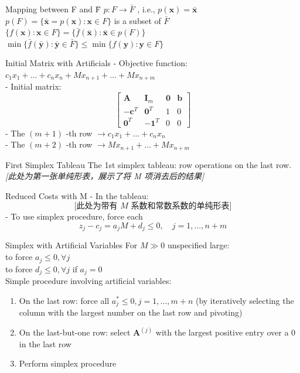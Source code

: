 \documentclass[aspectratio=169,hyperref,UTF8,CJK]{beamer}
\begin{document}
\begin{frame}{Mapping between F and F̄}
\(p:F\rightarrow \bar{F}\) , i.e., \(p(\mathbf{x}) = \bar{\mathbf{x}}\) \\
\(p(F) = \{\bar{\mathbf{x}} = p(\mathbf{x}):\mathbf{x}\in F\}\) is a subset of \(\bar{F}\) \\
\(\{f(\mathbf{x}):\mathbf{x}\in F\} = \{\bar{f} (\bar{\mathbf{x}}):\bar{\mathbf{x}}\in p(F)\}\) \\
\(\min \{\bar{f} (\bar{\mathbf{y}}):\bar{\mathbf{y}}\in \bar{F}\} \leq \min \{f(\mathbf{y}):\mathbf{y}\in F\}\)
\end{frame}

\begin{frame}{Initial Matrix with Artificials}
- Objective function: \(c_1x_1 + \ldots + c_nx_n + Mx_{n+1} + \ldots + Mx_{n+m}\) \\
- Initial matrix:
\[
\begin{bmatrix}
\mathbf{A} & \mathbf{I}_m & \mathbf{0} & \mathbf{b} \\
-\mathbf{c}^T & \mathbf{0}^T & 1 & 0 \\
\mathbf{0}^T & -\mathbf{1}^T & 0 & 0
\end{bmatrix}
\]
- The \((m+1)\) -th row \(\longrightarrow c_1x_1 + \ldots + c_nx_n\) \\
- The \((m+2)\) -th row \(\longrightarrow Mx_{n+1} + \ldots + Mx_{n+m}\)
\end{frame}

\begin{frame}{First Simplex Tableau}
The 1st simplex tableau: row operations on the last row. \\
\textit{[此处为第一张单纯形表，展示了将 M 项消去后的结果]}
\end{frame}

\begin{frame}{Reduced Costs with M}
- In the tableau:
\[
\textit{[此处为带有 M 系数和常数系数的单纯形表]}
\]
- To use simplex procedure, force each
\[
z_{j} - c_{j} = a_{j}M + d_{j}\leq 0,\quad j = 1,\ldots ,n + m
\]
\end{frame}

\begin{frame}{Simplex with Artificial Variables}
For \(M \gg 0\) unspecified large: \\
to force \(a_j \leq 0, \forall j\) \\
to force \(d_j \leq 0, \forall j\) if \(a_j = 0\) \\
Simple procedure involving artificial variables:
\begin{enumerate}
    \item On the last row: force all \(a_j^* \leq 0, j = 1, \ldots , m + n\) (by iteratively selecting the column with the largest number on the last row and pivoting)
    \item On the last-but-one row: select \(\mathbf{A}^{(j)}\) with the largest positive entry over a 0 in the last row
    \item Perform simplex procedure
\end{enumerate}
\end{frame}
\end{document}
